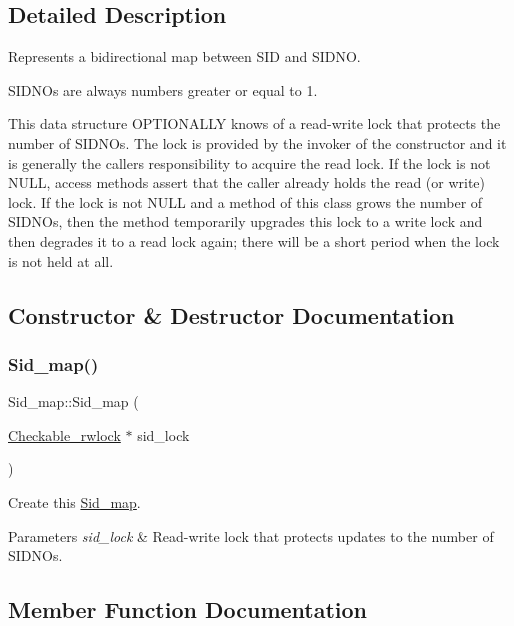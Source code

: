 \subsection{Detailed Description}
Represents a bidirectional map between S\+ID and S\+I\+D\+NO.

S\+I\+D\+N\+Os are always numbers greater or equal to 1.

This data structure O\+P\+T\+I\+O\+N\+A\+L\+LY knows of a read-\/write lock that protects the number of S\+I\+D\+N\+Os. The lock is provided by the invoker of the constructor and it is generally the caller\textquotesingle{}s responsibility to acquire the read lock. If the lock is not N\+U\+LL, access methods assert that the caller already holds the read (or write) lock. If the lock is not N\+U\+LL and a method of this class grows the number of S\+I\+D\+N\+Os, then the method temporarily upgrades this lock to a write lock and then degrades it to a read lock again; there will be a short period when the lock is not held at all. 

\subsection{Constructor \& Destructor Documentation}
\mbox{\label{classSid__map_adcb420a3241258cc68ab42910133144d}} 
\subsubsection{\texorpdfstring{Sid\+\_\+map()}{Sid\_map()}}
{\footnotesize\ttfamily Sid\+\_\+map\+::\+Sid\+\_\+map (\begin{DoxyParamCaption}\item[{\mbox{\hyperlink{classCheckable__rwlock}{Checkable\+\_\+rwlock}} $\ast$}]{sid\+\_\+lock }\end{DoxyParamCaption})}

Create this \mbox{\hyperlink{classSid__map}{Sid\+\_\+map}}.


\begin{DoxyParams}{Parameters}
{\em sid\+\_\+lock} & Read-\/write lock that protects updates to the number of S\+I\+D\+N\+Os. \\
\hline
\end{DoxyParams}


\subsection{Member Function Documentation}
\mbox{\label{classSid__map_a23aa9c0f385a44772e9e5c3955cca0cf}} 
